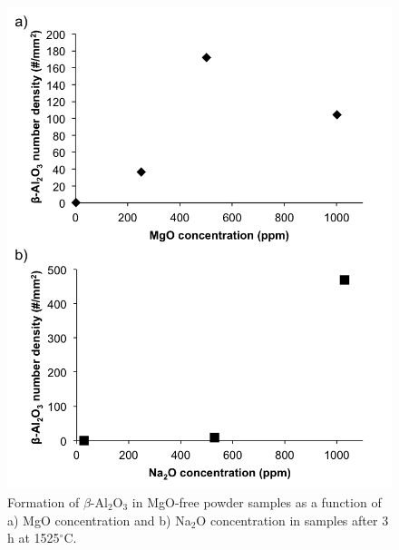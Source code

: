 \newpage
\begin{figure}[H]
	\centering
	\includegraphics{Chapter-5/Figures/Figure2.png}
	\caption{Formation of $\beta$-Al$_{2}$O$_{3}$ in MgO-free powder samples as a function of a) MgO concentration and b) Na$_{2}$O concentration in samples after 3 h at 1525$^{\circ}$C.}
	\label{Ch5-figure:Figure2}
\end{figure}

